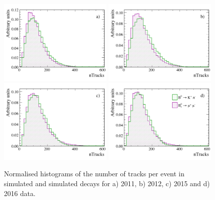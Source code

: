  \begin{figure}[tbp]
  \centering
    \includegraphics[width=0.49\textwidth]{./Figs/LifetimeMeasurement/nTracks_2011_Bs2MuMu_Bd2KPi.pdf}
    \includegraphics[width=0.49\textwidth]{./Figs/LifetimeMeasurement/nTracks_2012_Bs2MuMu_Bd2KPi.pdf}
    \includegraphics[width=0.49\textwidth]{./Figs/LifetimeMeasurement/nTracks_2015_Bs2MuMu_Bd2KPi.pdf}
    \includegraphics[width=0.49\textwidth]{./Figs/LifetimeMeasurement/nTracks_2016_Bs2MuMu_Bd2KPi.pdf}
  \caption{Normalised histograms of the number of tracks per event in simulated \bdkpi and simulated \bsmumu decays for a) 2011, b) 2012, c) 2015 and d) 2016 data.}%
                                                                                                                                                                                                            
  \label{fig:BsmmVsBdToKpinTracks}
\end{figure}%
